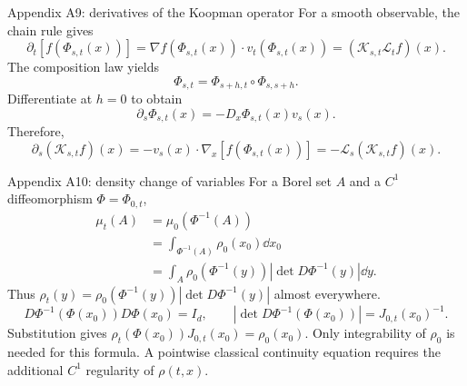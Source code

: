 \begin{frame}[t]{Appendix A9: derivatives of the Koopman operator}
\hypertarget{app:generator}{}
For a smooth observable, the chain rule gives
\begin{equation*}
  \partial_t[f(\Phi_{s,t}(x))]
  =\nabla f(\Phi_{s,t}(x))\cdot v_t(\Phi_{s,t}(x))
  =(\mathcal K_{s,t}\mathcal L_tf)(x).
\end{equation*}
The composition law yields
\begin{equation*}
  \Phi_{s,t}=\Phi_{s+h,t}\circ\Phi_{s,s+h}.
\end{equation*}
Differentiate at $h=0$ to obtain
\begin{equation*}
  \partial_s\Phi_{s,t}(x)=-D_x\Phi_{s,t}(x)v_s(x).
\end{equation*}
Therefore,
\begin{equation*}
  \partial_s(\mathcal K_{s,t}f)(x)
  =-v_s(x)\cdot\nabla_x[f(\Phi_{s,t}(x))]
  =-\mathcal L_s(\mathcal K_{s,t}f)(x).
\end{equation*}
\end{frame}

\begin{frame}[t]{Appendix A10: density change of variables}
\hypertarget{app:density}{}
For a Borel set $A$ and a $C^1$ diffeomorphism $\Phi=\Phi_{0,t}$,
\begin{equation*}
  \begin{aligned}
    \mu_t(A)&=\mu_0(\Phi^{-1}(A))\\
      &=\int_{\Phi^{-1}(A)}\rho_0(x_0)\dd x_0\\
      &=\int_A\rho_0(\Phi^{-1}(y))|\det D\Phi^{-1}(y)|\dd y.
  \end{aligned}
\end{equation*}
Thus $\rho_t(y)=\rho_0(\Phi^{-1}(y))|\det D\Phi^{-1}(y)|$ almost everywhere.
\begin{equation*}
  D\Phi^{-1}(\Phi(x_0))D\Phi(x_0)=I_d,\qquad
  |\det D\Phi^{-1}(\Phi(x_0))|=J_{0,t}(x_0)^{-1}.
\end{equation*}
Substitution gives $\rho_t(\Phi(x_0))J_{0,t}(x_0)=\rho_0(x_0)$.
Only integrability of $\rho_0$ is needed for this formula. A pointwise classical
continuity equation requires the additional $C^1$ regularity of $\rho(t,x)$.
\end{frame}

